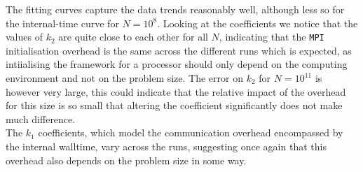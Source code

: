 \documentclass{article}
\begin{document}
The fitting curves capture the data trends reasonably well, although less so for the internal-time curve for $N=10^{8}$. Looking at the coefficients we notice that the values of $k_2$ are quite close to each other for all $N$, indicating that the \verb|MPI| initialisation overhead is the same across the different runs which is expected, as intiialising the framework for a processor should only depend on the computing environment and not on the problem size.
The error on $k_2$ for $N=10^{11}$ is however very large, this could indicate that the relative impact of the overhead for this size is so small that altering the coefficient significantly does not make much difference.\\
The $k_1$ coefficients, which model the communication overhead encompassed by the internal walltime, vary across the runs, suggesting once again that this overhead also depends on the problem size in some way.
\end{document}
